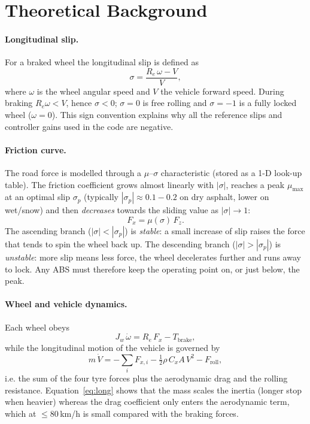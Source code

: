 \section{Theoretical Background}
\label{sec:theory}

\paragraph{Longitudinal slip.}
For a braked wheel the longitudinal slip is defined as
\begin{equation}
    \sigma = \frac{R_e\,\omega - V}{V},
    \label{eq:slip}
\end{equation}
where $\omega$ is the wheel angular speed and $V$ the vehicle forward
speed. During braking $R_e\omega < V$, hence $\sigma<0$; $\sigma=0$ is
free rolling and $\sigma=-1$ is a fully locked wheel ($\omega=0$). This
sign convention explains why all the reference slips and controller
gains used in the code are negative.

\paragraph{Friction curve.}
The road force is modelled through a $\mu$--$\sigma$ characteristic
(stored as a 1-D look-up table). The friction coefficient grows almost
linearly with $|\sigma|$, reaches a peak $\mu_\mathrm{max}$ at an
optimal slip $\sigma_p$ (typically $|\sigma_p|\approx0.1\!-\!0.2$ on
dry asphalt, lower on wet/snow) and then \emph{decreases} towards the
sliding value as $|\sigma|\to1$:
\begin{equation}
    F_x = \mu(\sigma)\,F_z .
    \label{eq:fx}
\end{equation}
The ascending branch ($|\sigma|<|\sigma_p|$) is \emph{stable}: a small
increase of slip raises the force that tends to spin the wheel back up.
The descending branch ($|\sigma|>|\sigma_p|$) is \emph{unstable}: more
slip means less force, the wheel decelerates further and runs away to
lock. Any ABS must therefore keep the operating point on, or just
below, the peak.

\paragraph{Wheel and vehicle dynamics.}
Each wheel obeys
\begin{equation}
    J_w\,\dot\omega = R_e\,F_x - T_\mathrm{brake},
    \label{eq:wheel}
\end{equation}
while the longitudinal motion of the vehicle is governed by
\begin{equation}
    m\,\dot V = -\!\!\sum_{i} F_{x,i} - \tfrac12\rho\,C_x A\,V^2 - F_\mathrm{roll},
    \label{eq:long}
\end{equation}
i.e. the sum of the four tyre forces plus the aerodynamic drag and the
rolling resistance. Equation~\eqref{eq:long} shows that the mass scales
the inertia (longer stop when heavier) whereas the drag coefficient
only enters the aerodynamic term, which at $\le80$\,km/h is small
compared with the braking forces.

